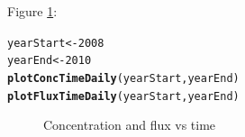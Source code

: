 \documentclass[a4paper,11pt]{article}\usepackage[]{graphicx}\usepackage[]{color}
\makeatletter
\newcommand{\hlnum}[1]{\textcolor[rgb]{0.686,0.059,0.569}{#1}}%
\newcommand{\hlstd}[1]{\textcolor[rgb]{0.345,0.345,0.345}{#1}}%
\newcommand{\hlkwb}[1]{\textcolor[rgb]{0.69,0.353,0.396}{#1}}%
\newcommand{\hlkwd}[1]{\textcolor[rgb]{0.737,0.353,0.396}{\textbf{#1}}}%
\newenvironment{kframe}{%
 \def\at@end@of@kframe{}%
 \ifinner\ifhmode%
  \def\at@end@of@kframe{\end{minipage}}%
  \begin{minipage}{\columnwidth}%
 \fi\fi%
 \def\FrameCommand##1{\hskip\@totalleftmargin \hskip-\fboxsep
 \colorbox{shadecolor}{##1}\hskip-\fboxsep
     \hskip-\linewidth \hskip-\@totalleftmargin \hskip\columnwidth}%
 \MakeFramed {\advance\hsize-\width
   \@totalleftmargin\z@ \linewidth\hsize
   \@setminipage}}%
 {\par\unskip\endMakeFramed%
 \at@end@of@kframe}
\newenvironment{knitrout}{}{} %
\makeatother
\begin{document}
Figure \ref{fig:plotConcTimeDaily}:
\begin{knitrout}
\color{fgcolor}\begin{kframe}
\begin{alltt}
\hlstd{yearStart} \hlkwb{<-} \hlnum{2008}
\hlstd{yearEnd} \hlkwb{<-} \hlnum{2010}
\hlkwd{plotConcTimeDaily}\hlstd{(yearStart, yearEnd)}
\hlkwd{plotFluxTimeDaily}\hlstd{(yearStart, yearEnd)}
\end{alltt}
\end{kframe}\begin{figure}[]
\caption[Concentration and flux vs time]{Concentration and flux vs time\label{fig:plotConcTimeDaily}}
\end{figure}


\end{knitrout}
\end{document}

